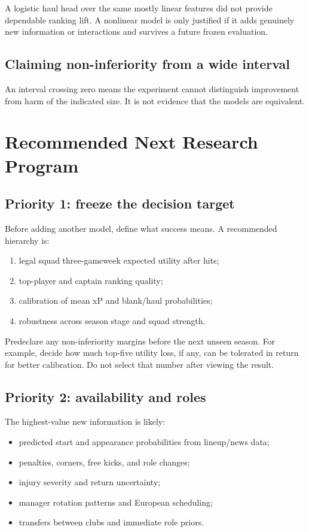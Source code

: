 \documentclass[11pt,a4paper]{article}
\begin{document}
A logistic haul head over the same mostly linear features did not provide dependable ranking lift. A nonlinear model is only justified if it adds genuinely new information or interactions and survives a future frozen evaluation.

\subsection{Claiming non-inferiority from a wide interval}

An interval crossing zero means the experiment cannot distinguish improvement from harm of the indicated size. It is not evidence that the models are equivalent.

\section{Recommended Next Research Program}

\subsection{Priority 1: freeze the decision target}

Before adding another model, define what success means. A recommended hierarchy is:

\begin{enumerate}
  \item legal squad three-gameweek expected utility after hits;
  \item top-player and captain ranking quality;
  \item calibration of mean xP and blank/haul probabilities;
  \item robustness across season stage and squad strength.
\end{enumerate}

Predeclare any non-inferiority margins before the next unseen season. For example, decide how much top-five utility loss, if any, can be tolerated in return for better calibration. Do not select that number after viewing the result.

\subsection{Priority 2: availability and roles}

The highest-value new information is likely:

\begin{itemize}
  \item predicted start and appearance probabilities from lineup/news data;
  \item penalties, corners, free kicks, and role changes;
  \item injury severity and return uncertainty;
  \item manager rotation patterns and European scheduling;
  \item transfers between clubs and immediate role priors.
\end{itemize}
\end{document}
